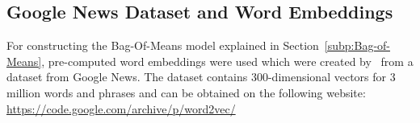 \clearpage

\subsection{Google News Dataset and Word Embeddings}
\label{sub:Google News Dataset and Word Embeddings}

For constructing the Bag-Of-Means model explained in Section~\ref{subp:Bag-of-Means}, pre-computed word embeddings were used which were created by~\cite{Mikolov:2013ab} from a dataset from Google News. The dataset contains 300-dimensional vectors for 3 million words and phrases and can be obtained on the following website: \url{https://code.google.com/archive/p/word2vec/}

%

%

